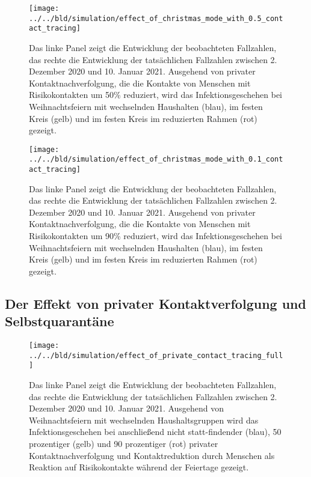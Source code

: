\documentclass[a4paper,11pt,leqno,fleqn]{article}
\begin{document}
\FloatBarrier


\begin{figure}
\label{fig:effect_of_christmas_with_mediocre_contact_tracing}
\texttt{[image: ../../bld/simulation/effect\_of\_christmas\_mode\_with\_0.5\_contact\_tracing]}
\caption{
    Das linke Panel zeigt die Entwicklung der beobachteten Fallzahlen, das rechte die Entwicklung der tatsächlichen Fallzahlen zwischen 2. Dezember 2020 und 10. Januar 2021. Ausgehend von privater Kontaktnachverfolgung, die die Kontakte von Menschen mit Risikokontakten um 50\% reduziert, wird das Infektionsgeschehen bei Weihnachtsfeiern mit wechselnden Haushalten (blau), im festen Kreis (gelb) und im festen Kreis im reduzierten Rahmen (rot) gezeigt.
}
\end{figure}

\FloatBarrier


\begin{figure}
\label{fig:effect_of_christmas_with_good_contact_tracing}
\texttt{[image: ../../bld/simulation/effect\_of\_christmas\_mode\_with\_0.1\_contact\_tracing]}
\caption{
    Das linke Panel zeigt die Entwicklung der beobachteten Fallzahlen, das rechte die Entwicklung der tatsächlichen Fallzahlen zwischen 2. Dezember 2020 und 10. Januar 2021. Ausgehend von privater Kontaktnachverfolgung, die die Kontakte von Menschen mit Risikokontakten um 90\% reduziert, wird das Infektionsgeschehen bei Weihnachtsfeiern mit wechselnden Haushalten (blau), im festen Kreis (gelb) und im festen Kreis im reduzierten Rahmen (rot) gezeigt.
}
\end{figure}

\FloatBarrier
\subsection{Der Effekt von privater Kontaktverfolgung und Selbstquarantäne}


\begin{figure}
\label{fig:effect_of_contact_tracing_with_full_christmas}
\texttt{[image: ../../bld/simulation/effect\_of\_private\_contact\_tracing\_full]}
\caption{
    Das linke Panel zeigt die Entwicklung der beobachteten Fallzahlen, das rechte die Entwicklung der tatsächlichen Fallzahlen zwischen 2. Dezember 2020 und 10. Januar 2021. Ausgehend von Weihnachtsfeiern mit wechselnden Haushaltsgruppen wird das Infektionsgeschehen bei anschließend nicht statt-findender (blau), 50 prozentiger (gelb) und 90 prozentiger (rot)
    privater Kontaktnachverfolgung und Kontaktreduktion durch Menschen als Reaktion auf Risikokontakte während der Feiertage gezeigt.
}
\end{figure}
\end{document}
